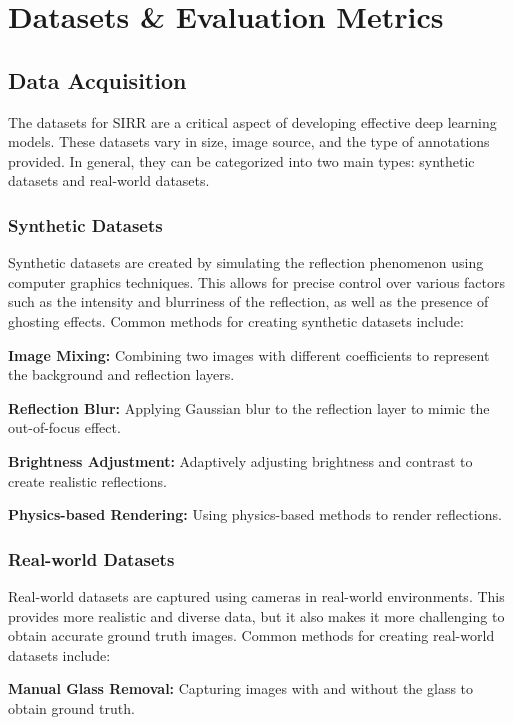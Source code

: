 \section{Datasets \& Evaluation Metrics}
\label{sec:datasets}

\subsection{Data Acquisition}

The datasets for SIRR are a critical aspect of developing effective deep learning models. These datasets vary in size, image source, and the type of annotations provided. In general, they can be categorized into two main types: synthetic datasets and real-world datasets.

\subsubsection{Synthetic Datasets}
Synthetic datasets are created by simulating the reflection phenomenon using computer graphics techniques. This allows for precise control over various factors such as the intensity and blurriness of the reflection, as well as the presence of ghosting effects. Common methods for creating synthetic datasets include:

\textbf{Image Mixing:} Combining two images with different coefficients to represent the background and reflection layers.

\textbf{Reflection Blur:} Applying Gaussian blur to the reflection layer to mimic the out-of-focus effect.

\textbf{Brightness Adjustment:} Adaptively adjusting brightness and contrast to create realistic reflections.


\textbf{Physics-based Rendering:} Using physics-based methods to render reflections.

\subsubsection{Real-world Datasets}

Real-world datasets are captured using cameras in real-world environments. This provides more realistic and diverse data, but it also makes it more challenging to obtain accurate ground truth images. Common methods for creating real-world datasets include:

\textbf{Manual Glass Removal:} Capturing images with and without the glass to obtain ground truth.

